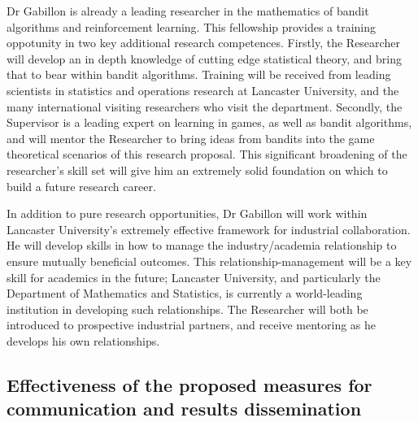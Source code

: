\documentclass[a4paper,11pt]{article}
\begin{document}
Dr Gabillon is already a leading researcher in the mathematics of bandit algorithms and reinforcement learning.  This fellowship provides a training oppotunity in two key additional research competences.  Firstly, the Researcher will develop an in depth knowledge of cutting edge statistical theory, and bring that to bear within bandit algorithms.  Training will be received from leading scientists in statistics and operations research at Lancaster University, and the many international visiting researchers who visit the department.   Secondly, the Supervisor is a leading expert on learning in games, as well as bandit algorithms, and will mentor the Researcher to bring ideas from bandits into the game theoretical scenarios of this research proposal.  This significant broadening of the researcher's skill set will give him an extremely solid foundation on which to build a future research career.

In addition to pure research opportunities, Dr Gabillon will work within Lancaster University's extremely effective framework for industrial collaboration.  He will develop skills in how to manage the industry/academia relationship to ensure mutually beneficial outcomes.  This relationship-management will be a key skill for academics in the future; Lancaster University, and particularly the Department of Mathematics and Statistics, is currently a world-leading institution in developing such relationships.  The Researcher will both be introduced to prospective industrial partners, and receive mentoring as he develops his own relationships.


\subsection{Effectiveness of the proposed measures for communication and results dissemination}
\end{document}

